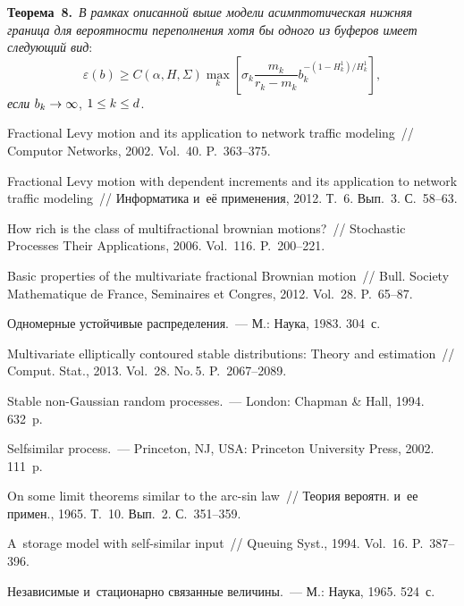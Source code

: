 \begin{multicols}{2}
\noindent
\textbf{Теорема~8.}\
\textit{В рамках описанной выше модели асимптотическая нижняя граница для вероятности переполнения хотя бы одного из буферов
имеет следующий вид}:
$$
\varepsilon (b) \geq C(\alpha , H, \Sigma ) 
\max\limits_k \left[ \sigma_k \frac{m_k}{r_k - m_k} 
b_k^{-(1-H_k^1 )/H_k^1 } \right] ,
$$
\textit{если} $b_k\hm\to\infty$, $1\hm\leq k\hm\leq d$.

{\small\frenchspacing
 {%
 \begin{thebibliography}{99}
Fractional Levy motion and its application to network traffic
modeling~// Computor Networks, 2002. Vol.~40. P.~363--375.

Fractional Levy motion with dependent increments and its application
to network traffic modeling~// Информатика и~её применения, 2012.
Т.~6. Вып.~3. С.~58--63.


 How rich is the class of multifractional
brownian motions?~// Stochastic Processes Their Applications,
2006. Vol.~116. P.~200--221.


Basic properties of the multivariate fractional Brownian motion~//
Bull. Society Mathematique de France, Seminaires et Congres,
2012. Vol.~28. P.~65--87.



 Одномерные устойчивые распределения.~--- М.:
Наука, 1983. 304~с.

  Multivariate elliptically contoured stable
distributions: Theory and estimation~//
 Comput. Stat., 2013. Vol.~28. No.\,5. P.~2067--2089.

 Stable non-Gaussian random
processes.~--- London: Chapman \& Hall, 1994. 632~p.

 Selfsimilar process.~--- Princeton,
NJ, USA: Princeton University Press, 2002. 111~p.

 On some limit theorems similar to the arc-sin law~// 
Теория вероятн. и~ее примен., 1965. Т.~10. Вып.~2. С.~351--359.

 A~storage model with self-similar input~// Queuing
Syst., 1994. Vol.~16. P.~387--396.

 Независимые и~стационарно
связанные величины.~--- М.: Наука, 1965.  524~с.
\end{thebibliography}

 }
 }

\end{multicols}


